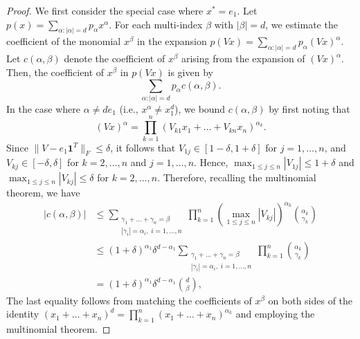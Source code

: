 \documentclass[12pt]{article}
\theoremstyle{remark}
\begin{document}
\begin{proof}
We first consider the special case where $x^*=e_1$. Let $p(x)=\sum_{\alpha:|\alpha|=d}p_{\alpha}x^{\alpha}$. For each multi-index $\beta$ with $|\beta|=d$, we estimate the coefficient of the monomial $x^{\beta}$ in the expansion $p(Vx)=\sum_{\alpha:|\alpha|=d}p_{\alpha}(Vx)^{\alpha}$. 
Let $c(\alpha,\beta)$ denote the coefficient of $x^{\beta}$ arising from the expansion of $(Vx)^{\alpha}$. Then, the coefficient of $x^{\beta}$ in $p(Vx)$ is given by $$\sum_{\alpha:|\alpha|=d}p_{\alpha}c(\alpha,\beta).$$
In the case where $\alpha\neq de_1$ (i.e., $x^{\alpha}\neq x_1^d$), we bound $c(\alpha,\beta)$ by first noting that $$(Vx)^{\alpha}=\prod_{k=1}^n(V_{k1}x_1+\ldots+V_{kn}x_n)^{\alpha_k}.$$ 
Since $\|V-e_1\mathbf{1}^T\|_{F}\le \delta$, it follows that $V_{1j}\in[1-\delta,1+\delta]$ for $j=1,\ldots, n$, and $V_{kj}\in[-\delta,\delta]$ for $k=2,\ldots, n$ and $j=1,\ldots, n$. Hence, $\max_{1\le j\le n}|V_{1j}|\le 1+\delta$ and $\max_{1\le j\le n}|V_{kj}|\le \delta$ for  $k=2,\ldots,n$. 
Therefore, recalling the multinomial theorem, we have
\begin{equation}\label{eq:optfree_b1}
\begin{aligned}
|c(\alpha,\beta)|&\le \sum_{\substack{\gamma_1+\ldots+\gamma_n=\beta \\ |\gamma_i|=\alpha_i,\; i=1,\ldots,n}}\prod_{k=1}^n \left(\max_{1\le j\le n}|V_{kj}|\right)^{\alpha_k}\binom{\alpha_k}{\gamma_k}\\
&\le (1+\delta)^{\alpha_1}\delta^{d-\alpha_1}\sum_{\substack{\gamma_1+\ldots+\gamma_n=\beta \\ |\gamma_i|=\alpha_i,\; i=1,\ldots,n}}\prod_{k=1}^n \binom{\alpha_k}{\gamma_k}\\
&=(1+\delta)^{\alpha_1}\delta^{d-\alpha_1} \binom{d}{\beta},
\end{aligned}    
\end{equation}
The last equality follows from matching the coefficients of $x^{\beta}$ on both sides of the identity $(x_1+\dots+x_n)^d=\prod_{k=1}^n(x_1+\ldots+x_n)^{\alpha_k}$ and employing the multinomial theorem. 


\end{proof}
\end{document}
